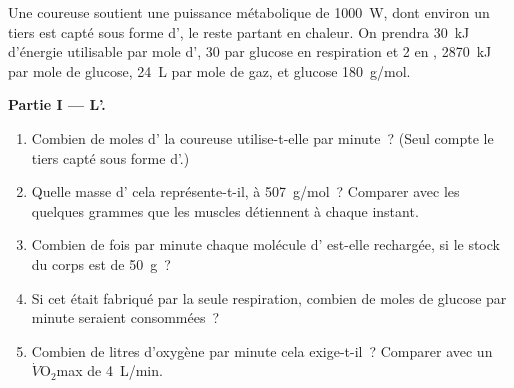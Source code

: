 \begin{problem}
\label{pb:g12:respiration-fermentation:1}
Une coureuse soutient une puissance métabolique de \qty{1000}{W}, dont
environ un tiers est capté sous forme d', le reste partant en
chaleur. On prendra \qty{30}{kJ} d'énergie utilisable par mole d',
30  par glucose en respiration et 2 en ,
\qty{2870}{kJ} par mole de glucose, \qty{24}{L} par mole de gaz, et
glucose \qty{180}{g/mol}.

\medskip
\noindent\textbf{Partie I --- L'.}
\begin{enumerate}
  \item Combien de moles d' la coureuse utilise-t-elle par minute~?
        (Seul compte le tiers capté sous forme d'.)
  \item Quelle masse d' cela représente-t-il, à \qty{507}{g/mol}~?
        Comparer avec les quelques grammes que les muscles détiennent
        à chaque instant.
  \item Combien de fois par minute chaque molécule d' est-elle
        rechargée, si le stock du corps est de \qty{50}{g}~?
  \item Si cet  était fabriqué par la seule respiration, combien de
        moles de glucose par minute seraient consommées~?
  \item Combien de litres d'oxygène par minute cela exige-t-il~?
        Comparer avec un $\dot V\!\mathrm{O_2}$max de \qty{4}{L/min}.
\end{enumerate}


\end{problem}
